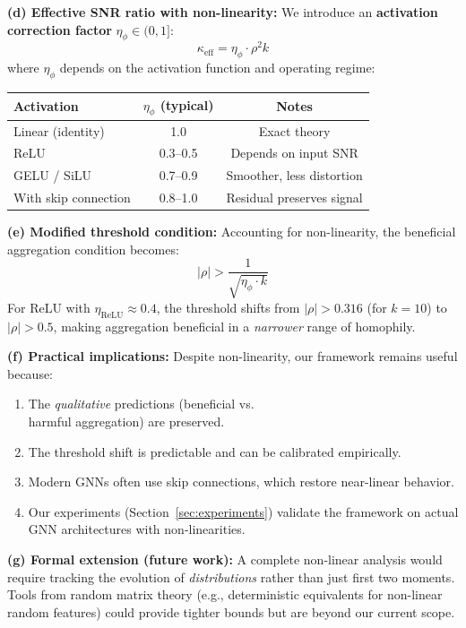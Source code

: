 \begin{remark}
\textbf{(d) Effective SNR ratio with non-linearity:}
We introduce an \textbf{activation correction factor} $\eta_\phi \in (0, 1]$:
\begin{equation}
    \kappa_{\mathrm{eff}} = \eta_\phi \cdot \rho^2 k
\end{equation}
where $\eta_\phi$ depends on the activation function and operating regime:
\begin{center}
\begin{tabular}{lcc}
\toprule
Activation & $\eta_\phi$ (typical) & Notes \\
\midrule
Linear (identity) & 1.0 & Exact theory \\
ReLU & 0.3--0.5 & Depends on input SNR \\
GELU / SiLU & 0.7--0.9 & Smoother, less distortion \\
With skip connection & 0.8--1.0 & Residual preserves signal \\
\bottomrule
\end{tabular}
\end{center}

\textbf{(e) Modified threshold condition:}
Accounting for non-linearity, the beneficial aggregation condition becomes:
\begin{equation}
    |\rho| > \frac{1}{\sqrt{\eta_\phi \cdot k}}
\end{equation}
For ReLU with $\eta_{\mathrm{ReLU}} \approx 0.4$, the threshold shifts from $|\rho| > 0.316$ (for $k=10$) to $|\rho| > 0.5$, making aggregation beneficial in a \textit{narrower} range of homophily.

\textbf{(f) Practical implications:}
Despite non-linearity, our framework remains useful because:
\begin{enumerate}
    \item The \textit{qualitative} predictions (beneficial vs.\\ harmful aggregation) are preserved.
    \item The threshold shift is predictable and can be calibrated empirically.
    \item Modern GNNs often use skip connections, which restore near-linear behavior.
    \item Our experiments (Section~\ref{sec:experiments}) validate the framework on actual GNN architectures with non-linearities.
\end{enumerate}

\textbf{(g) Formal extension (future work):}
A complete non-linear analysis would require tracking the evolution of \textit{distributions} rather than just first two moments. Tools from random matrix theory (e.g., deterministic equivalents for non-linear random features) could provide tighter bounds but are beyond our current scope.
\end{remark}

